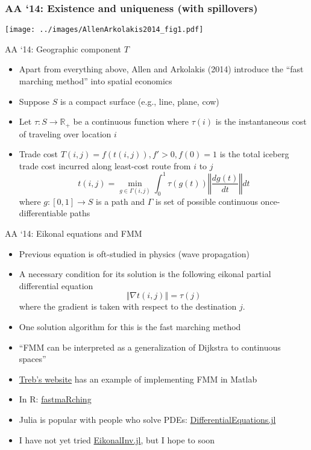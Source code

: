 \documentclass[11pt,notes=hide,aspectratio=169]{beamer}
\begin{document}
\begin{frame}
\frametitle{AA `14: Existence and uniqueness (with spillovers)}
\begin{center}
\texttt{[image: ../images/AllenArkolakis2014\_fig1.pdf]}
\end{center}
\end{frame}
\begin{frame}{AA `14: Geographic component $T$}
\begin{itemize}
	\item Apart from everything above, Allen and Arkolakis (2014) introduce the ``fast marching method'' into spatial economics
	\item Suppose $S$ is a compact surface (e.g., line, plane, cow) 
	\item Let $\tau: S\to\mathbb{R}_{+}$ be a continuous function where $\tau(i)$ is the instantaneous cost of traveling over location $i$
	\item Trade cost $T(i,j) = f(t(i,j)), f'>0, f(0)=1$ is the total iceberg trade cost incurred along least-cost route from $i$ to $j$
	$$t(i,j) = \min_{g\in\Gamma(i,j)} \int_{0}^{1} \tau(g(t)) \left\Vert \frac{dg(t)}{dt} \right\Vert dt$$
	where $g:[0,1]\to S$ is a path and $\Gamma$ is set of possible continuous once-differentiable paths
\end{itemize}
\end{frame}
\begin{frame}{AA `14: Eikonal equations and FMM}
\begin{itemize}
	\item Previous equation is oft-studied in physics (wave propagation)
	\item A necessary condition for its solution is the following eikonal partial differential equation
	$$\left\Vert \nabla t(i,j) \right\Vert =\tau(j) $$
	where the gradient is taken with respect to the destination $j$.
	\item One solution algorithm for this is the fast marching method
	\item ``FMM can be interpreted as a generalization of Dijkstra to continuous spaces''
	\item \href{https://sites.google.com/site/treballen/research}{Treb's website} has an example of implementing FMM in Matlab
	\item In R: \href{https://cran.r-project.org/web/packages/fastmaRching/index.html}{fastmaRching}
	\item Julia is popular with people who solve PDEs: \href{https://github.com/SciML/DifferentialEquations.jl}{DifferentialEquations.jl}
	\item I have not yet tried \href{https://github.com/JuliaInv/EikonalInv.jl}{EikonalInv.jl}, but I hope to soon
\end{itemize}
\end{frame}
\end{document}
